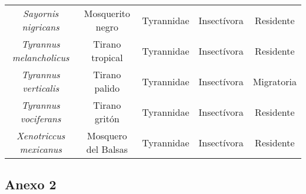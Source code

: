 \documentclass[letterpaper,12pt]{article}
\begin{document}
{\begin{longtable}[c] {|c|c|c|c|c|}
\textit{Sayornis nigricans} & Mosquerito negro & Tyrannidae & Insectívora & Residente \\
\textit{Tyrannus melancholicus} & Tirano tropical & Tyrannidae & Insectívora & Residente \\
\textit{Tyrannus verticalis} & Tirano palido & Tyrannidae & Insectívora & Migratoria \\
\textit{Tyrannus vociferans} & Tirano gritón & Tyrannidae & Insectívora & Residente \\
\textit{Xenotriccus mexicanus} & Mosquero del Balsas &  Tyrannidae & Insectívora & Residente \\ \bottomrule
 
\end{longtable}
}
\subsection{Anexo 2}
\end{document}
